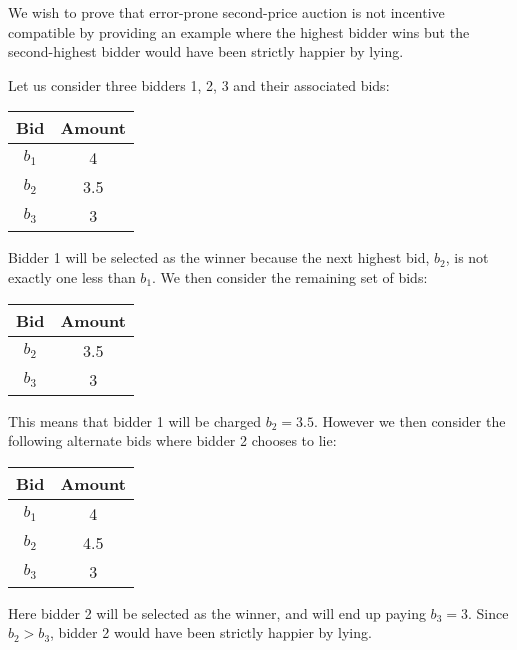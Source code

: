 \documentclass[12pt]{article}%
\begin{document}
We wish to prove that error-prone second-price auction is not incentive compatible by providing an example where the highest bidder wins but the second-highest bidder would have been strictly happier by lying.

Let us consider three bidders 1, 2, 3 and their associated bids:

\begin{center}
\begin{tabular}{|c|c|}
\hline
Bid   & Amount \\ \hline
$b_1$ & 4      \\ \hline
$b_2$ & 3.5      \\ \hline
$b_3$ & 3      \\ \hline
\end{tabular}
\end{center}

Bidder 1 will be selected as the winner because the next highest bid, $b_2$, is not exactly one less than $b_1$. We then consider the remaining set of bids: 

\begin{center}
\begin{tabular}{|c|c|}
\hline
Bid   & Amount \\ \hline
$b_2$ & 3.5      \\ \hline
$b_3$ & 3      \\ \hline
\end{tabular}
\end{center}

This means that bidder 1 will be charged $b_2 = 3.5$. However we then consider the following alternate bids where bidder 2 chooses to lie:

\begin{center}
\begin{tabular}{|c|c|}
\hline
Bid   & Amount \\ \hline
$b_1$ & 4      \\ \hline
$b_2$ & 4.5      \\ \hline
$b_3$ & 3      \\ \hline
\end{tabular}
\end{center}

Here bidder 2 will be selected as the winner, and will end up paying $b_3 = 3$. Since $b_2 > b_3$, bidder 2 would have been strictly happier by lying.
\end{document}
